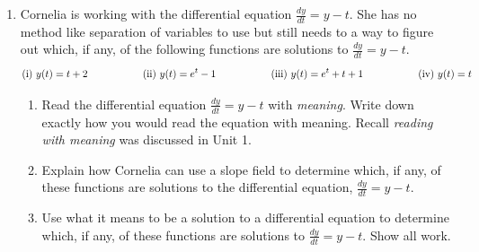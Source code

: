 \begin{enumerate}
\clearpage

\item Cornelia is working with the differential equation $\displaystyle\frac{dy}{dt}= y - t$.  She has no method like separation of variables to use but still needs to a way to figure out which, if any, of the following functions are solutions to $\displaystyle\frac{dy}{dt}= y - t$. \label{05HWproblem6}
\[
\text{(i) }y(t)= t + 2 \hspace{.75in} \text{(ii) }y(t)= e^t-1 \hspace{.75in} \text{(iii) }y(t) = e^t  + t + 1 \hspace{.75in} \text{(iv) }y(t) = t
\]
  
\begin{enumerate}
\item Read the differential equation $\displaystyle\frac{dy}{dt}= y - t$ with {\em meaning}. Write down exactly how you would read the equation with meaning. Recall {\em reading with meaning} was discussed in Unit 1.
\item	Explain how Cornelia can use a slope field to determine which, if any, of these functions are solutions to the differential equation, $\displaystyle\frac{dy}{dt}= y - t$. 
\item	Use what it means to be a solution to a differential equation to determine which, if any, of these functions are solutions to $\displaystyle\frac{dy}{dt}= y - t$.  Show all work.
\end{enumerate}

\end{enumerate}

